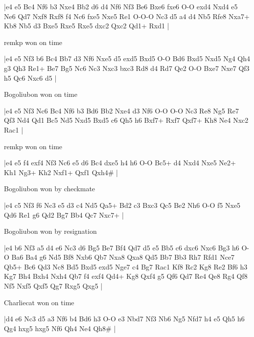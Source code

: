 \makegametitle
|e4 e5 Bc4 Nf6 b3 Nxe4 Bb2 d6 d4 Nf6 Nf3 Be6 Bxe6 fxe6 O-O exd4 Nxd4 e5 Ne6 Qd7 Nxf8 Rxf8 f4 Nc6 fxe5 Nxe5 Re1 O-O-O Nc3 d5 a4 d4 Nb5 Rfe8 Nxa7+ Kb8 Nb5 d3 Bxe5 Rxe5 Rxe5 dxc2 Qxc2 Qd1+ Rxd1  |

\showboard

remkp won on time

\makegametitle
|e4 e5 Nf3 b6 Bc4 Bb7 d3 Nf6 Nxe5 d5 exd5 Bxd5 O-O Bd6 Bxd5 Nxd5 Ng4 Qh4 g3 Qh3 Re1+ Be7 Bg5 Nc6 Nc3 Nxc3 bxc3 Rd8 d4 Rd7 Qe2 O-O Bxe7 Nxe7 Qf3 h5 Qc6 Nxc6 d5  |

\showboard

Bogoliubon won on time

\makegametitle
|e4 e5 Nf3 Nc6 Bc4 Nf6 b3 Bd6 Bb2 Nxe4 d3 Nf6 O-O O-O Nc3 Re8 Ng5 Re7 Qf3 Nd4 Qd1 Bc5 Nd5 Nxd5 Bxd5 c6 Qh5 h6 Bxf7+ Rxf7 Qxf7+ Kh8 Ne4 Nxc2 Rac1  |

\showboard

remkp won on time

\makegametitle
|e4 e5 f4 exf4 Nf3 Nc6 e5 d6 Bc4 dxe5 h4 h6 O-O Bc5+ d4 Nxd4 Nxe5 Ne2+ Kh1 Ng3+ Kh2 Nxf1+ Qxf1 Qxh4\#  |

\showboard

Bogoliubon won by checkmate

\makegametitle
|e4 c5 Nf3 f6 Nc3 e5 d3 c4 Nd5 Qa5+ Bd2 c3 Bxc3 Qc5 Be2 Nh6 O-O f5 Nxe5 Qd6 Re1 g6 Qd2 Bg7 Bb4 Qc7 Nxc7+  |

\showboard

Bogoliubon won by resignation

\makegametitle
|e4 b6 Nf3 a5 d4 e6 Nc3 d6 Bg5 Be7 Bf4 Qd7 d5 e5 Bb5 c6 dxc6 Nxc6 Bg3 h6 O-O Ba6 Ba4 g6 Nd5 Bf8 Nxb6 Qb7 Nxa8 Qxa8 Qd5 Bb7 Bb3 Rh7 Rfd1 Nce7 Qb5+ Bc6 Qd3 Nc8 Bd5 Bxd5 exd5 Nge7 c4 Bg7 Rac1 Kf8 Rc2 Kg8 Re2 Bf6 h3 Kg7 Bh4 Bxh4 Nxh4 Qb7 f4 exf4 Qd4+ Kg8 Qxf4 g5 Qf6 Qd7 Re4 Qe8 Rg4 Qf8 Nf5 Nxf5 Qxf5 Qg7 Rxg5 Qxg5  |

\showboard

Charliecat won on time

\makegametitle
|d4 e6 Nc3 d5 a3 Nf6 b4 Bd6 h3 O-O e3 Nbd7 Nf3 Nb6 Ng5 Nfd7 h4 e5 Qh5 h6 Qg4 hxg5 hxg5 Nf6 Qh4 Ne4 Qh8\#  |

